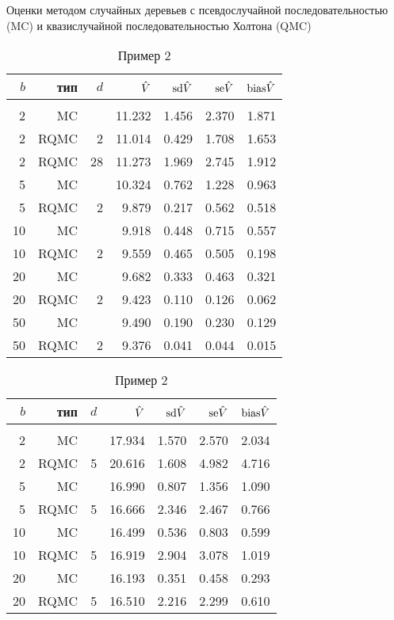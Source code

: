 \begin{table}
    \renewcommand{\arraystretch}{0.6}
    \centering
    Оценки методом случайных деревьев с псевдослучайной последовательностью (MC) и квазислучайной последовательностью Холтона (QMC)
    \caption{Пример 1}\label{tbl:random_tree_halton_ex1}
    \begin{tabular}{rrrrrrr}
        $b$&тип&$d$&$\hat{V}$&$\mathrm{sd}\hat{V}$&$\mathrm{se}\hat{V}$&$\mathrm{bias}\hat{V}$\\[3pt]\hline\\[-8pt]
        2&MC&&11.232&1.456&2.370&1.871\\
        2&RQMC&2&11.014&0.429&1.708&1.653\\
        2&RQMC&28&11.273&1.969&2.745&1.912\\[3pt]
        5&MC&&10.324&0.762&1.228&0.963\\
        5&RQMC&2&9.879&0.217&0.562&0.518\\[3pt]
        10&MC&&9.918&0.448&0.715&0.557\\
        10&RQMC&2&9.559&0.465&0.505&0.198\\[3pt]
        20&MC&&9.682&0.333&0.463&0.321\\
        20&RQMC&2&9.423&0.110&0.126&0.062\\[3pt]
        50&MC&&9.490&0.190&0.230&0.129\\
		50&RQMC&2&9.376&0.041&0.044&0.015\\[3pt]
    \end{tabular}

    \centering
    \caption{Пример 2}\label{tbl:random_tree_halton_ex2}
    \begin{tabular}{rrrrrrr}
        $b$&тип&$d$&$\hat{V}$&$\mathrm{sd}\hat{V}$&$\mathrm{se}\hat{V}$&$\mathrm{bias}\hat{V}$\\[3pt]\hline\\[-8pt]
        2&MC&&17.934&1.570&2.570&2.034\\
        2&RQMC&5&20.616&1.608&4.982&4.716\\[3pt]
        5&MC&&16.990&0.807&1.356&1.090\\
        5&RQMC&5&16.666&2.346&2.467&0.766\\[3pt]
        10&MC&&16.499&0.536&0.803&0.599\\
        10&RQMC&5&16.919&2.904&3.078&1.019\\[3pt]
        20&MC&&16.193&0.351&0.458&0.293\\
        20&RQMC&5&16.510&2.216&2.299&0.610\\[3pt]
    \end{tabular}


\end{table}
